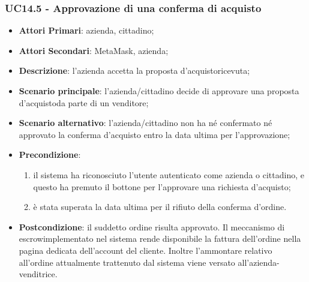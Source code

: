 \subsubsection{UC14.5 - Approvazione di una conferma di acquisto}
\begin{itemize}
	\item \textbf{Attori Primari}: azienda, cittadino;
	\item \textbf{Attori Secondari}: MetaMask\glo, azienda;
	\item \textbf{Descrizione}: l'azienda accetta la proposta d'acquisto\glosp ricevuta;
	\item \textbf{Scenario principale}: l'azienda/cittadino decide di approvare una proposta d'acquisto\glosp da parte di un venditore;
	\item \textbf{Scenario alternativo}: l'azienda/cittadino non ha né confermato né approvato la conferma d'acquisto entro la data ultima per l'approvazione;

	\item \textbf{Precondizione}: 
	\begin{enumerate}[label=\alph*.]
		\item il sistema ha riconosciuto l'utente autenticato come azienda o cittadino, e questo ha premuto il bottone per l'approvare una richiesta d'acquisto;
		\item è stata superata la data ultima per il rifiuto della conferma d'ordine\glo.
	\end{enumerate}
	\item \textbf{Postcondizione}: il suddetto ordine risulta approvato. Il meccanismo di escrow\glosp implementato nel sistema rende disponibile la fattura dell'ordine nella pagina dedicata dell'account del cliente. Inoltre l'ammontare relativo all'ordine attualmente trattenuto dal sistema viene versato all'azienda-venditrice.
\end{itemize}


